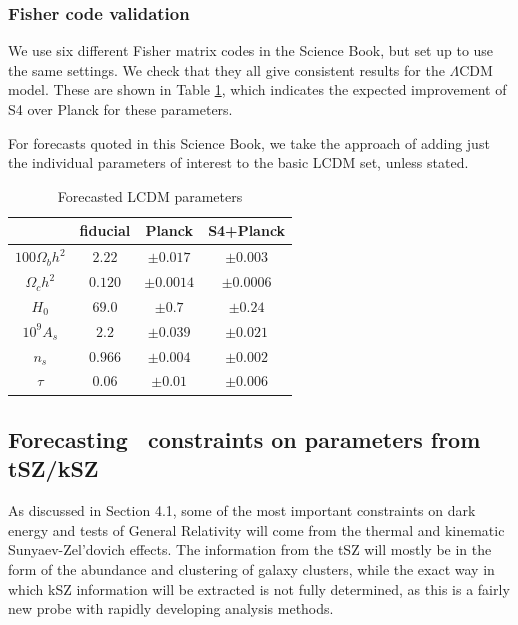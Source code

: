 \subsubsection{Fisher code validation}

We use six different Fisher matrix codes in the Science Book, but set up to use the same settings. We check that they all give consistent results for the $\Lambda$CDM model. These are shown in Table \ref{tab:fisher}, which indicates the expected improvement of S4 over Planck for these parameters. 

For forecasts quoted in this Science Book, we take the approach of adding just the individual parameters of interest to the basic LCDM set, unless stated.

\begin{table}
  \centering
\caption{\small Forecasted LCDM parameters}
\begin{tabular}{c  c  c  c  }
\hline
\hline
  & fiducial & Planck &  S4+Planck \\
 \hline
$100\Omega_bh^2$   & $2.22$ & $\pm 0.017$ & $\pm 0.003$ \\
$\Omega_ch^2$      & $0.120$ &$\pm 0.0014$  & $\pm 0.0006$  \\
$H_0$              & $69.0$ &  $\pm 0.7$     & $\pm 0.24$    \\
$10^{9}A_s$        & $2.2$  &$\pm 0.039$   & $\pm0.021$  \\
$n_s$             & $0.966$&  $\pm 0.004$   & $\pm0.002$ \\
$\tau$            & $0.06$ &  $\pm 0.01$   & $\pm0.006$ \\
\hline
\end{tabular}
\label{tab:fisher}
  \end{table}




\subsection{Forecasting \cmbexp\ constraints on parameters from tSZ/kSZ}

As discussed in Section 4.1, some of the most important constraints on dark energy and tests of 
General Relativity will come from the thermal and kinematic Sunyaev-Zel'dovich effects. The information
from the tSZ will mostly be in the form of the abundance and clustering of galaxy clusters, while the 
exact way in which kSZ information will be extracted is not fully determined, as this is a fairly new probe
with rapidly developing analysis methods.

